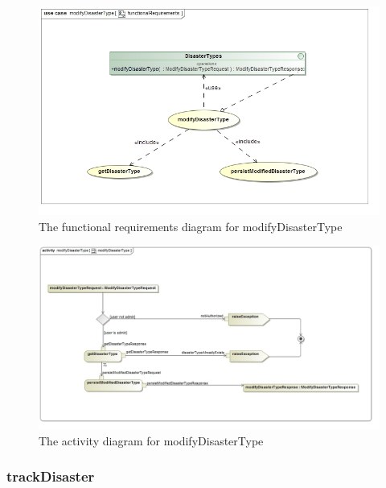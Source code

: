 \begin{figure}[H]
	\centering
	\includegraphics[width=1.0\textwidth]{../images/funcReq/modifyDisasterTypeFunctionalRequirements.jpg}
	\caption{The functional requirements diagram for modifyDisasterType \label{overflow}}
\end{figure}

\begin{figure}[H]
	\centering
	\includegraphics[width=1.0\textwidth]{../images/funcReq/modifyDisasterTypeActivityDiagram.jpg}
	\caption{The activity diagram for modifyDisasterType \label{overflow}}
\end{figure}

\subsubsection{trackDisaster}

